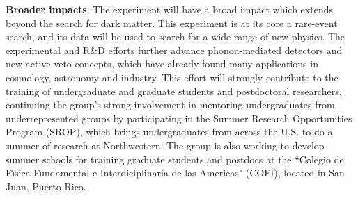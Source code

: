 \textbf{Broader impacts}: The \scs experiment will have a broad impact which extends beyond the search for dark matter. This experiment is at its core a rare-event search, and its data will be used to search for a wide range of new physics. The experimental and R\&D efforts further advance phonon-mediated detectors and new active veto concepts, which have already found many applications in cosmology, astronomy and industry. This effort will strongly contribute to the training of undergraduate and graduate students and postdoctoral researchers, continuing the group's strong involvement in mentoring undergraduates from underrepresented groups by participating in the Summer Research Opportunities Program (SROP), which brings undergraduates from across the U.S. to do a summer of research at Northwestern. The group is also working to develop summer schools for training graduate students and postdocs at the ``Colegio de F\'{\i}sica Fundamental e Interdiciplinaria de las Americas" (COFI), located in San Juan, Puerto Rico.
